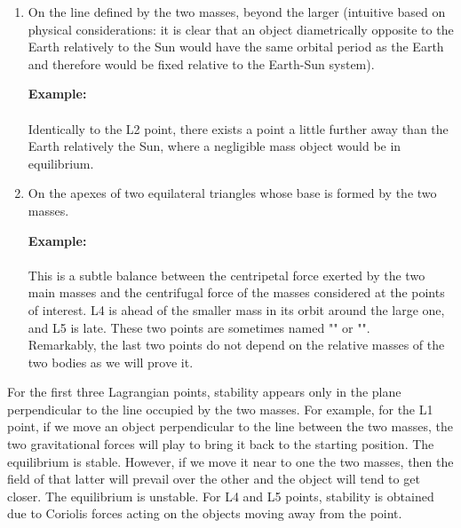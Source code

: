 \begin{enumerate}
		\item[L3:] On the line defined by the two masses, beyond the larger (intuitive based on physical considerations: it is clear that an object diametrically opposite to the Earth relatively to the Sun would have the same orbital period as the Earth and therefore would be fixed relative to the Earth-Sun system).

		\begin{tcolorbox}[colframe=black,colback=white,sharp corners]
		\textbf{{\Large {}}Example:}\\\\
		Identically to the L2 point, there exists a point a little further away than the Earth relatively the Sun, where a negligible mass object would be in equilibrium.
		\end{tcolorbox}
		

		\item[L4 \& L5:] On the apexes of two equilateral triangles whose base is formed by the two masses.
		
		\begin{tcolorbox}[colframe=black,colback=white,sharp corners]
		\textbf{{\Large {}}Example:}\\\\
		This is a subtle balance between the centripetal force exerted by the two main masses and the centrifugal force of the masses considered at the points of interest. L4 is ahead of the smaller mass in its orbit around the large one, and L5 is late. These two points are sometimes named "" or "".\\

	Remarkably, the last two points do not depend on the relative masses of the two bodies as we will prove it.
		\end{tcolorbox}

	\end{enumerate}
	For the first three Lagrangian points, stability appears only in the plane perpendicular to the line occupied by the two masses. For example, for the L1 point, if we move an object perpendicular to the line between the two masses, the two gravitational forces will play to bring it back to the starting position. The equilibrium is stable. However, if we move it near to one the two masses, then the field of that latter will prevail over the other and the object will tend to get closer. The equilibrium is unstable. For L4 and L5 points, stability is obtained due to Coriolis forces acting on the objects moving away from the point.
	
